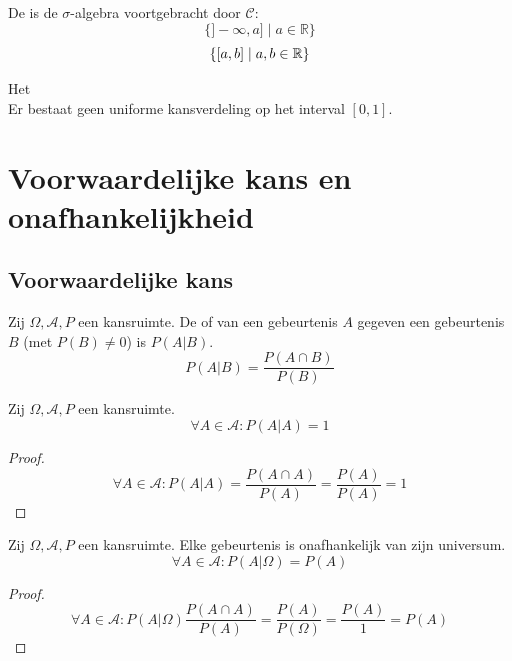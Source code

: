 \documentclass[main.tex]{subfiles}
\begin{document}
\begin{de}
  De  is de $\sigma$-algebra voortgebracht door $\mathcal{C}$:
  \[ \{ ]-\infty,a] \mid a \in \mathbb{R} \} \]  
  \[ \{ \interval{a}{b} \mid a,b\in \mathbb{R} \} \]  
\end{de}

\begin{st}
  Het \\
  Er bestaat geen uniforme kansverdeling op het interval $[0,1]$.
\zb
\end{st}

\section{Voorwaardelijke kans en onafhankelijkheid}
\label{sec:voorwaardelijke-kans-en-onafhankelijkheid}

\subsection{Voorwaardelijke kans}
\label{sec:voorwaardelijke-kans}

\begin{de}
  \label{de:voorwaardelijke-kans} 
  Zij $\Omega,\mathcal{A},P$ een kansruimte.
  De  of  van een gebeurtenis $A$ gegeven een gebeurtenis $B$ (met $P(B) \neq 0$) is $P(A|B)$.
  \[ P(A|B) = \frac{P(A\cap B)}{P(B)} \]
\end{de}

\begin{ei}
  Zij $\Omega,\mathcal{A},P$ een kansruimte.
  \[ \forall A \in \mathcal{A}: P(A|A) = 1 \]

  \begin{proof}
    \[ \forall A \in \mathcal{A}: P(A|A) = \frac{P(A \cap A)}{P(A)} = \frac{P(A)}{P(A)} = 1 \]
  \end{proof}
\end{ei}

\begin{ei}
  \label{ei:gebeurtenis onafhankelijk van universum}
  Zij $\Omega,\mathcal{A},P$ een kansruimte.
  Elke gebeurtenis is onafhankelijk van zijn universum.
  \[ \forall A \in \mathcal{A}: P(A|\Omega) = P(A) \]

  \begin{proof}
    \[ \forall A \in \mathcal{A}: P(A|\Omega) \frac{P(A \cap A)}{P(A)} = \frac{P(A)}{P(\Omega)} = \frac{P(A)}{1} = P(A)\]
  \end{proof}
\end{ei}
\end{document}
